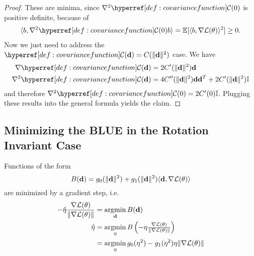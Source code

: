 \begin{proof}
	These are minima, since \(\grad^2\C(0)\) is positive definite, because of
	\begin{align*}
		\langle b, \grad^2\C(0) b\rangle = \E[\langle b, \grad\Loss(\param)\rangle^2] \ge 0.
	\end{align*}
	Now we just need to address the \(\C(\step) = \sqC(\|\step\|^2)\) case. We have
	\begin{align*}
		\grad \C(\step) &= 2\sqC'(\|\step\|^2) \step\\
		\grad^2 \C(\step) &= 4 \sqC''(\|\step\|^2) \step \step^T + 2\sqC'(\|\step\|^2)\identity
	\end{align*}
	and therefore \(\grad^2\C(0) = 2\sqC'(0)\identity\). Plugging these results
	into the general formula yields the claim.
\end{proof}

\subsection{Minimizing the BLUE in the Rotation Invariant Case}

\begin{lemma}\label{lem: rotation invariant implies GD}
	Functions of the form
	\begin{equation*}
		B(\mathbf{d})
		= g_0(\|\mathbf{d}\|^2) + g_1(\|\mathbf{d}\|^2)\langle \mathbf{d}, \nabla\mathcal{L}(\theta)\rangle
	\end{equation*}
	are minimized by a gradient step, i.e.
	\begin{align}
		-\hat{\eta}\frac{\nabla\mathcal{L}(\theta)}{\|\nabla\mathcal{L}(\theta)\|}
		&= \operatorname*{argmin}_{\mathbf{d}}B(\mathbf{d})\\
		\hat{\eta} &\begin{aligned}[t]
			&=\operatorname*{argmin}_{\eta} B\left(-\eta \tfrac{\nabla\mathcal{L}(\theta)}{\|\nabla\mathcal{L}(\theta)\|}\right)\\
			&= \operatorname*{argmin}_{\eta} g_0(\eta^2) -  g_1(\eta^2)\eta\|\nabla\mathcal{L}(\theta)\|
		\end{aligned}
	\end{align}
\end{lemma}

